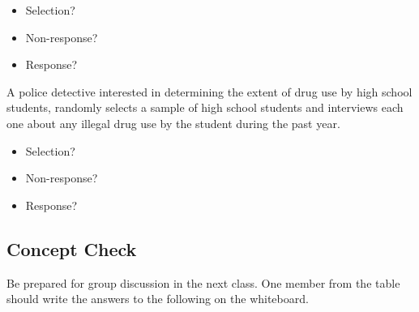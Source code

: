 \documentclass[
]{report}
\providecommand{\tightlist}{%
  \setlength{\itemsep}{0pt}\setlength{\parskip}{0pt}}
\begin{document}
\begin{itemize}
\tightlist
\item
  Selection?
\end{itemize}

\vspace{0.25in}

\begin{itemize}
\tightlist
\item
  Non-response?
\end{itemize}

\vspace{0.25in}

\begin{itemize}
\tightlist
\item
  Response?
\end{itemize}

\vspace{0.25in}

A police detective interested in determining the extent of drug use by high school students, randomly selects a sample of high school students and interviews each one about any illegal drug use by the student during the past year.

\begin{itemize}
\tightlist
\item
  Selection?
\end{itemize}

\vspace{0.25in}

\begin{itemize}
\tightlist
\item
  Non-response?
\end{itemize}

\vspace{0.25in}

\begin{itemize}
\tightlist
\item
  Response?
\end{itemize}

\vspace{0.25in}

\subsection{Concept Check}\label{concept-check-1}

Be prepared for group discussion in the next class. One member from the table should write the answers to the following on the whiteboard.
\end{document}
